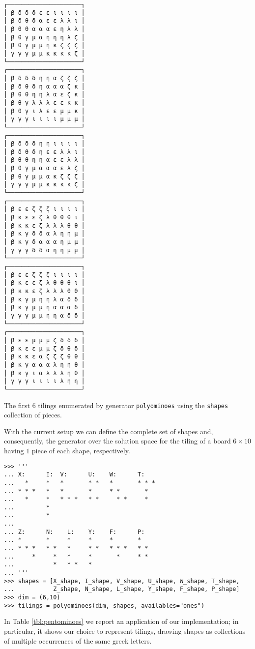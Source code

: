 \begin{margintable}[-2cm]
\inputminted[baselinestretch=0.8]
    {python}{backtracking/pentominoes-regular-snippet.py}
\begin{Verbatim}[baselinestretch=0.1]
┌─────────────────────┐
│ β δ δ δ ε ε ι ι ι ι │
│ β δ θ δ α ε ε λ λ ι │
│ β θ θ α α α ε η λ λ │
│ β θ γ μ α η η η λ ζ │
│ β θ γ μ μ η κ ζ ζ ζ │
│ γ γ γ μ μ κ κ κ κ ζ │
└─────────────────────┘
┌─────────────────────┐
│ β δ δ δ η η α ζ ζ ζ │
│ β δ θ δ η α α α ζ κ │
│ β θ θ η η λ α ε ζ κ │
│ β θ γ λ λ λ ε ε κ κ │
│ β θ γ ι λ ε ε μ μ κ │
│ γ γ γ ι ι ι ι μ μ μ │
└─────────────────────┘
┌─────────────────────┐
│ β δ δ δ η η ι ι ι ι │
│ β δ θ δ η ε ε λ λ ι │
│ β θ θ η η α ε ε λ λ │
│ β θ γ μ α α α ε λ ζ │
│ β θ γ μ μ α κ ζ ζ ζ │
│ γ γ γ μ μ κ κ κ κ ζ │
└─────────────────────┘
┌─────────────────────┐
│ β ε ε ζ ζ ζ ι ι ι ι │
│ β κ ε ε ζ λ θ θ θ ι │
│ β κ κ ε ζ λ λ λ θ θ │
│ β κ γ δ δ α λ η η μ │
│ β κ γ δ α α α η μ μ │
│ γ γ γ δ δ α η η μ μ │
└─────────────────────┘
┌─────────────────────┐
│ β ε ε ζ ζ ζ ι ι ι ι │
│ β κ ε ε ζ λ θ θ θ ι │
│ β κ κ ε ζ λ λ λ θ θ │
│ β κ γ μ η η λ α δ δ │
│ β κ γ μ μ η α α α δ │
│ γ γ γ μ μ η η α δ δ │
└─────────────────────┘
┌─────────────────────┐
│ β ε ε μ μ μ ζ δ δ δ │
│ β κ ε ε μ μ ζ δ θ δ │
│ β κ κ ε α ζ ζ ζ θ θ │
│ β κ γ α α α λ η η θ │
│ β κ γ ι α λ λ λ η θ │
│ γ γ γ ι ι ι ι λ η η │
└─────────────────────┘
\end{Verbatim}
\caption{The first $6$ tilings enumerated by generator \texttt{polyominoes}
using the \texttt{shapes} collection of pieces.}
\label{tbl:pentominoes}
\end{margintable}
With the current setup we can define the complete set of shapes and,
consequently, the generator over the solution space for the tiling of a board
$6\times 10$ having $1$ piece of each shape, respectively.
\begin{verbatim}
>>> '''
... X:      I:  V:      U:    W:      T:
...   *     *   *       * *   *       * * *
... * * *   *   *       *     * *       *
...   *     *   * * *   * *     * *     *
...         *
...         *
...
... Z:      N:    L:    Y:    F:      P:
... *       *     *     *     *       *
... * * *   * *   *     * *   * * *   * *
...     *     *   *     *       *     * *
...           *   * *   *
... '''
>>> shapes = [X_shape, I_shape, V_shape, U_shape, W_shape, T_shape,
...           Z_shape, N_shape, L_shape, Y_shape, F_shape, P_shape]
>>> dim = (6,10)
>>> tilings = polyominoes(dim, shapes, availables="ones")
\end{verbatim}
In Table \ref{tbl:pentominoes} we report an application of our implementation;
in particular, it shows our choice to represent tilings, drawing shapes as
collections of multiple occurrences of the same greek letters.

